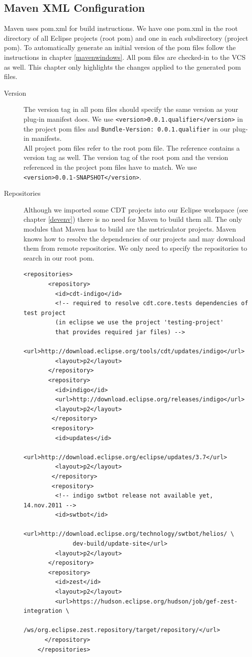 \documentclass[11pt,a4paper,oneside]{scrreprt}
\begin{document}
\subsection{Maven XML Configuration}\label{mavenxml}
Maven uses pom.xml for build instructions. We have one pom.xml in the root directory of all Eclipse projects (root pom) and one in each subdirectory (project pom). To automatically generate an initial version of the pom files follow the instructions in chapter \ref{mavenwindows}. All pom files are checked-in to the VCS as well. This chapter only highlights the changes applied to the generated pom files.
\begin{description}

\item[Version]
The version tag in all pom files should specify the same version as your plug-in manifest does. We use \texttt{<version>0.0.1.qualifier</version>} in the project pom files and \texttt{Bundle-Version: 0.0.1.qualifier} in our plug-in manifests.\\
All project pom files refer to the root pom file. The reference contains a version tag as well. The version tag of the root pom and the version referenced in the project pom files have to match. We use \texttt{<version>0.0.1-SNAPSHOT</version>}.

\item[Repositories]
Although we imported some CDT projects into our Eclipse workspace (see chapter \ref{devenv}) there is no need for Maven to build them all. The only modules that Maven has to build are the metriculator projects. Maven knows how to resolve the dependencies of our projects and may download them from remote repositories. We only need to specify the repositories to search in our root pom.

\begin{lstlisting}[style=Xml, caption=Maven repositories]
<repositories>
       <repository>
         <id>cdt-indigo</id>
		 <!-- required to resolve cdt.core.tests dependencies of test project 
		 (in eclipse we use the project 'testing-project'
		 that provides required jar files) -->
         <url>http://download.eclipse.org/tools/cdt/updates/indigo</url>
         <layout>p2</layout>
       </repository>
	   <repository>
         <id>indigo</id>
         <url>http://download.eclipse.org/releases/indigo</url>
         <layout>p2</layout>
	    </repository>	
		<repository>
         <id>updates</id>
         <url>http://download.eclipse.org/eclipse/updates/3.7</url>
         <layout>p2</layout>
		</repository>	
		<repository>
		 <!-- indigo swtbot release not available yet, 14.nov.2011 -->
         <id>swtbot</id>
         <url>http://download.eclipse.org/technology/swtbot/helios/ \
              dev-build/update-site</url>
         <layout>p2</layout>
       </repository>
	   <repository>
         <id>zest</id>
         <layout>p2</layout>
         <url>https://hudson.eclipse.org/hudson/job/gef-zest-integration \
         /ws/org.eclipse.zest.repository/target/repository/</url>
      </repository>	   
	</repositories>
\end{lstlisting}


\end{description}
\end{document}
